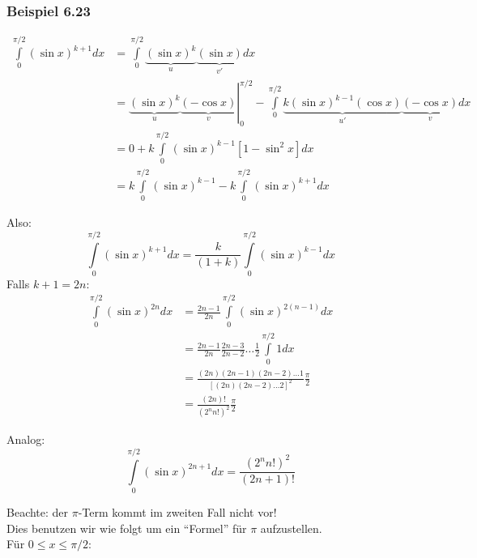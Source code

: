 \subsubsection*{Beispiel 6.23}

\begin{align*}
\int\limits_0^{\pi /2} {(\sin x)^{k + 1}dx} &=\int\limits_0^{\pi /2} {\underbrace {{{(\sin x)}^k}}_u\underbrace {(\sin x)}_{v'}dx}  \\
&=\left. {\underbrace {{{(\sin x)}^k}}_u\underbrace {( - \cos x)}_v} \right|_0^{\pi /2} - \int\limits_0^{\pi /2} {\underbrace {k{{(\sin x)}^{k - 1}}(\cos x)}_{u'}} \underbrace {( - \cos x)}_vdx\\
&=0 + k\int\limits_0^{\pi /2} {{{(\sin x)}^{k - 1}}} \left[ {1 - {{\sin }^2}x} \right]dx\\
 &=k\int\limits_0^{\pi /2} {{{(\sin x)}^{k - 1}} - k\int\limits_0^{\pi /2} {{{(\sin x)}^{k + 1}}} dx}
\end{align*}

Also:
\[\int\limits_0^{\pi /2} {{{(\sin x)}^{k + 1}}dx = \frac{k}{{(1 + k)}}\int\limits_0^{\pi /2} {{{(\sin x)}^{k - 1}}dx} } \]
Falls $k+1=2n$:
\begin{align*}
\int\limits_0^{\pi /2} {(\sin x)}^{2n}dx &=\frac{2n - 1}{2n}\int\limits_0^{\pi /2} {{(\sin x)}^{2(n - 1)}}dx\\
 &=\frac{{2n - 1}}{{2n}}\frac{{2n - 3}}{{2n - 2}} \ldots \frac{1}{2}\int\limits_0^{\pi /2} {1dx} \\
 &=\frac{{(2n)(2n - 1)(2n - 2) \ldots 1}}{{{{\left[ {(2n)(2n - 2) \ldots 2} \right]}^2}}}\frac{\pi }{2}\\
 &=\frac{{(2n)!}}{{{{({2^n}n!)}^2}}}\frac{\pi }{2}
\end{align*}

\noindent Analog:
\[\int\limits_0^{\pi /2} {{{(\sin x)}^{2n + 1}}dx = \frac{{{{({2^n}n!)}^2}}}{{(2n + 1)!}}} \]

\noindent Beachte: der $\pi$-Term kommt im zweiten Fall nicht vor!\\

\noindent Dies benutzen wir wie folgt um ein ``Formel'' für $\pi$ aufzustellen.\\

\noindent Für $0\leq x \leq\pi/2$:


